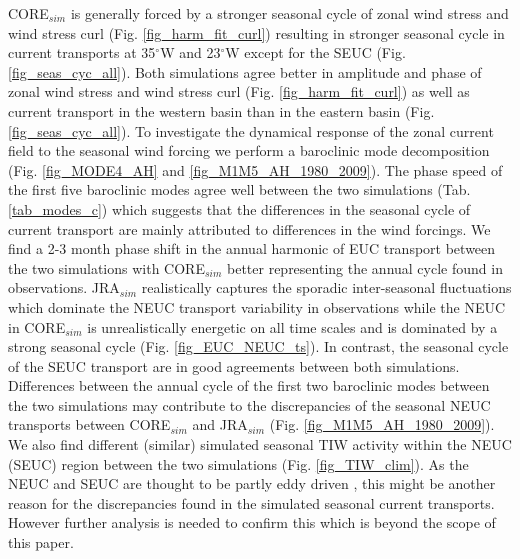 \documentclass[os, manuscript]{copernicus}
\begin{document}
CORE$_{sim}$ is generally forced by a stronger seasonal cycle of zonal wind stress and wind stress curl (Fig. \ref{fig_harm_fit_curl}) resulting in stronger seasonal cycle in current transports at 35$^{\circ}$W and 23$^{\circ}$W except for the SEUC (Fig. \ref{fig_seas_cyc_all}). Both simulations agree better in amplitude and phase of zonal wind stress and wind stress curl (Fig. \ref{fig_harm_fit_curl}) as well as current transport in the western basin than in the eastern basin (Fig. \ref{fig_seas_cyc_all}). To investigate the dynamical response of the zonal current field to the seasonal wind forcing we perform a baroclinic mode decomposition (Fig. \ref{fig_MODE4_AH} and \ref{fig_M1M5_AH_1980_2009}). The phase speed of the first five baroclinic modes agree well between the two simulations (Tab. \ref{tab_modes_c}) which suggests that the differences in the seasonal cycle of current transport are mainly attributed to differences in the wind forcings. We find a 2-3 month phase shift in the annual harmonic of EUC transport between the two simulations with CORE$_{sim}$ better representing the annual cycle found in observations. JRA$_{sim}$ realistically captures the sporadic inter-seasonal fluctuations which dominate the NEUC transport variability in observations while the NEUC in CORE$_{sim}$ is unrealistically energetic on all time scales and is dominated by a strong seasonal cycle (Fig. \ref{fig_EUC_NEUC_ts}). In contrast, the seasonal cycle of the SEUC transport are in good agreements between both simulations. Differences between the annual cycle of the first two baroclinic modes between the two simulations may contribute to the discrepancies of the seasonal NEUC transports between CORE$_{sim}$ and JRA$_{sim}$ (Fig. \ref{fig_M1M5_AH_1980_2009}). We also find different (similar) simulated seasonal TIW activity within the NEUC (SEUC) region between the two simulations (Fig. \ref{fig_TIW_clim}). As the NEUC and SEUC are thought to be partly eddy driven \citep[e.g.][]{Jochum2004b,Assene2020}, this might be another reason for the discrepancies found in the simulated seasonal current transports. However further analysis is needed to confirm this which is beyond the scope of this paper.  
\end{document}
